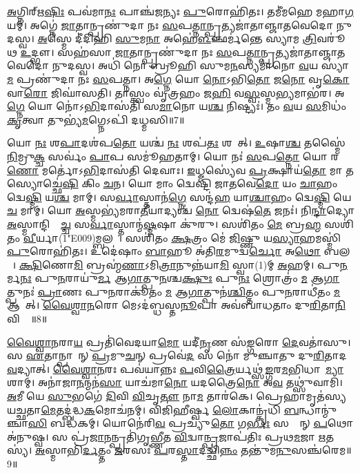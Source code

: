 \ul{𑌅}𑌗𑍍𑌨𑌿𑌰𑍍\mbox{}𑌋\ul{𑌷𑌿𑌃} 𑌪𑌵॑𑌮𑌾\ul{𑌨𑌃} 𑌪𑌾𑌞𑍍𑌚॑𑌜𑌨𑍍𑌯𑌃 \ul{𑌪𑍁}𑌰𑍋𑌹𑌿॑𑌤𑌃। 
𑌤𑌮𑍀॑𑌮𑌹𑍇 𑌮𑌹𑌾\ul{𑌗}𑌯𑌮𑍍। 
𑌅𑌗𑍍𑌨𑍇॑ \ul{𑌜𑌾}𑌤𑌾𑌨𑍍𑌪𑍍𑌰𑌣𑍁॑𑌦𑌾 𑌨𑌃 \ul{𑌸}𑌪\ul{𑌤𑍍𑌨𑌾}𑌨𑍍𑌪𑍍𑌰𑌤𑍍𑌯𑌜𑌾॑𑌤𑌾𑌞𑍍𑌜𑌾𑌤𑌵𑍇𑌦𑍋 𑌨𑍁𑌦𑌸𑍍𑌵। 
\ul{𑌅}𑌸𑍍𑌮𑍇 𑌦𑍀॑𑌦𑌿𑌹𑌿 \ul{𑌸𑍁}𑌮\ul{𑌨𑌾} 𑌅𑌹𑍇॑\ul{𑌳}𑌞𑍍𑌛𑌰𑍍𑌮॑𑌨𑍍𑌤𑍇 𑌸𑍍𑌯𑌾𑌮 \ul{𑌤𑍍𑌰𑌿}𑌵𑌰𑍂॑𑌥 \ul{𑌉}𑌦𑍍𑌭𑍗। 
𑌸𑌹॑𑌸𑌾 \ul{𑌜𑌾}𑌤𑌾𑌨𑍍𑌪𑍍𑌰𑌣𑍁॑𑌦𑌾 𑌨𑌃 \ul{𑌸}𑌪\ul{𑌤𑍍𑌨𑌾}𑌨𑍍𑌪𑍍𑌰𑌤𑍍𑌯𑌜𑌾॑𑌤𑌾𑌞𑍍𑌜𑌾𑌤𑌵𑍇𑌦𑍋 𑌨𑍁𑌦𑌸𑍍𑌵। 
𑌅𑌧𑌿॑ 𑌨𑍋 𑌬𑍍𑌰𑍂𑌹𑌿 𑌸𑍁𑌮\ul{𑌨}𑌸𑍍𑌯𑌮𑌾॑𑌨𑍋 \ul{𑌵}𑌯 𑌸𑍍𑌯𑌾॑\ul{𑌮} 𑌪𑍍𑌰𑌣𑍁॑𑌦𑌾 𑌨𑌃 \ul{𑌸}𑌪𑌤𑍍𑌨𑌾\sn{}। 
𑌅\ul{𑌗𑍍𑌨𑍇} 𑌯𑍋 \ul{𑌨𑍋}𑌽𑌭𑌿\ul{𑌤𑍋} 𑌜\ul{𑌨𑍋} 𑌵𑍃\ul{𑌕𑍋} 𑌵𑌾\ul{𑌰𑍋} 𑌜𑌿𑌘𑌾॑𑌸𑌤𑌿। 
𑌤𑌾𑌸𑍍𑌤𑍍𑌵𑌂 𑌵𑍃॑𑌤𑍍𑌰𑌹𑌂 𑌜\ul{𑌹𑌿} 𑌵\ul{𑌸𑍍𑌵}𑌸𑍍𑌮\ul{𑌭𑍍𑌯}𑌮𑌾𑌭॑𑌰। 
𑌅\ul{𑌗𑍍𑌨𑍇} 𑌯𑍋 𑌨𑍋॑𑌽\ul{𑌭𑌿}𑌦𑌾𑌸॑𑌤𑌿 𑌸\ul{𑌮𑌾}𑌨𑍋 𑌯\ul{𑌶𑍍𑌚} 𑌨𑌿𑌷𑍍𑌟𑍍𑌯𑌃॑। 
𑌤𑌂 \ul{𑌵}𑌯 \ul{𑌸}𑌮𑌿𑌧𑌂॑ \ul{𑌕𑍃}𑌤𑍍𑌵𑌾 𑌤𑍁𑌭𑍍𑌯॑\ul{𑌮}𑌗𑍍𑌨𑍇𑌽𑌪𑌿॑ 𑌦𑌧𑍍𑌮𑌸𑌿॥7॥

𑌯𑍋 \ul{𑌨𑌃} 𑌶\ul{𑌪𑌾}𑌦𑌶॑𑌪\ul{𑌤𑍋} 𑌯𑌶𑍍𑌚॑ \ul{𑌨𑌃} 𑌶𑌪॑\ul{𑌤𑌃} 𑌶𑌪𑌾᳚𑌤𑍍। 
\ul{𑌉}𑌷𑌾\ul{𑌶𑍍𑌚} 𑌤𑌸𑍍𑌮𑍈॑ \ul{𑌨𑌿}𑌮𑍍𑌰𑍁\ul{𑌕𑍍𑌚} 𑌸𑌰𑍍𑌵𑌂॑ \ul{𑌪𑌾}𑌪 𑌸𑌮𑍂॑𑌹𑌤𑌾𑌮𑍍। 
𑌯𑍋 𑌨𑌃॑ \ul{𑌸}𑌪\ul{𑌤𑍍𑌨𑍋} 𑌯𑍋 𑌰\ul{𑌣𑍋} 𑌮𑌰𑍍𑌤𑍋॑𑌽\ul{𑌭𑌿}𑌦𑌾𑌸॑𑌤𑌿 𑌦𑍇𑌵𑌾𑌃। 
\ul{𑌇}𑌧𑍍𑌮𑌸𑍍𑌯𑍇॑𑌵 \ul{𑌪𑍍𑌰}𑌕𑍍𑌷𑌾𑌯॑\ul{𑌤𑍋} 𑌮𑌾 𑌤𑌸𑍍𑌯𑍋𑌚𑍍𑌛𑍇॑\ul{𑌷𑌿} 𑌕𑌿𑌂 \ul{𑌚}𑌨। 
𑌯𑍋 𑌮𑌾𑌂 𑌦𑍍𑌵𑍇𑌷𑍍𑌟𑌿॑ 𑌜𑌾𑌤𑌵𑍇\ul{𑌦𑍋} 𑌯𑌂 \ul{𑌚𑌾}𑌹𑌂 𑌦𑍍𑌵𑍇\ul{𑌷𑍍𑌮𑌿} 𑌯\ul{𑌶𑍍𑌚} 𑌮𑌾𑌮𑍍। 
𑌸\ul{𑌰𑍍𑌵𑌾}\ul{}𑌸𑍍𑌤𑌾𑌨॑\ul{𑌗𑍍𑌨𑍇} 𑌸𑌨𑍍𑌦॑\ul{𑌹} 𑌯𑌾\ul{𑌶𑍍𑌚𑌾}𑌹𑌂 𑌦𑍍𑌵𑍇\ul{𑌷𑍍𑌮𑌿} 𑌯𑍇 \ul{𑌚} 𑌮𑌾𑌮𑍍। 
𑌯𑍋 \ul{𑌅}𑌸𑍍𑌮𑌭𑍍𑌯॑𑌮𑌰𑌾\ul{𑌤𑍀}𑌯𑌾𑌦𑍍𑌯𑌶𑍍𑌚॑ \ul{𑌨𑍋} 𑌦𑍍𑌵𑍇𑌷॑\ul{𑌤𑍇} 𑌜𑌨𑌃॑। 
𑌨𑌿\ul{𑌨𑍍𑌦𑌾}𑌦𑍍𑌯𑍋 \ul{𑌅}𑌸𑍍𑌮𑌾𑌨𑍍𑌦𑌿𑌫𑍍𑌸𑌾᳚\ul{𑌚𑍍𑌚} 𑌸\ul{𑌰𑍍𑌵𑌾}\ul{}𑌸𑍍𑌤𑌾𑌨𑍍𑌮॑\ul{𑌷𑍍𑌮}𑌷𑌾 𑌕𑍁॑𑌰𑍁। 
𑌸𑌶𑌿॑𑌤𑌂 \ul{𑌮𑍇} 𑌬𑍍𑌰\ul{𑌹𑍍𑌮} 𑌸𑌶𑌿॑𑌤𑌂 \ul{𑌵𑍀}𑌰𑍍𑌯𑌾(1\char"E009)𑌮𑍍𑌬𑌲𑌮𑍍᳚। 
𑌸𑌶𑌿॑𑌤𑌂 \ul{𑌕𑍍𑌷}𑌤𑍍𑌰𑌂 𑌮𑍇॑ \ul{𑌜𑌿}𑌷𑍍𑌣𑍁 𑌯\ul{𑌸𑍍𑌯𑌾}𑌹𑌮𑌸𑍍𑌮𑌿॑ \ul{𑌪𑍁}𑌰𑍋𑌹𑌿॑𑌤𑌃। 
𑌉𑌦𑍇॑𑌷𑌾𑌂 \ul{𑌬𑌾}𑌹𑍂 𑌅॑𑌤𑌿\ul{𑌰}𑌮𑍁𑌦𑍍𑌵\ul{𑌰𑍍𑌚𑍋} 𑌅\ul{𑌥𑍋} 𑌬𑌲𑌮𑍍᳚। 
\ul{𑌕𑍍𑌷𑌿}𑌣𑍋\ul{𑌮𑌿} 𑌬𑍍𑌰𑌹𑍍𑌮॑\ul{𑌣𑌾}𑌽𑌮𑌿\ul{𑌤𑍍𑌰𑌾}𑌨𑍁𑌨𑍍𑌨॑𑌯𑌾\ul{𑌮𑌿} 𑌸𑍍𑌵𑌾(1)𑌮𑍍 \ul{𑌅}𑌹𑌮𑍍। 
𑌪𑍁\ul{𑌨}𑌰𑍍𑌮\ul{𑌨𑌃} 𑌪𑍁\ul{𑌨}𑌰𑌾𑌯𑍁॑\ul{𑌰𑍍𑌮} 𑌆\ul{𑌗𑌾}𑌤𑍍𑌪𑍁\ul{𑌨}𑌶𑍍𑌚\ul{𑌕𑍍𑌷𑍁𑌃} 𑌪𑍁\ul{𑌨𑌃} 𑌶𑍍𑌰𑍋𑌤𑍍𑌰𑌂॑ \ul{𑌮} 𑌆\ul{𑌗𑌾}𑌤𑍍𑌪𑍁𑌨𑌃॑ \ul{𑌪𑍍𑌰𑌾}𑌣𑌃 𑌪𑍁\ul{𑌨}𑌰𑌾𑌕𑍂॑𑌤𑌂 \ul{𑌮} 𑌆\ul{𑌗𑌾}𑌤𑍍𑌪𑍁𑌨॑\ul{𑌶𑍍𑌚𑌿}𑌤𑍍𑌤𑌂 𑌪𑍁\ul{𑌨}𑌰𑌾𑌧𑍀॑𑌤𑌂 \ul{𑌮} 𑌆𑌗𑌾᳚𑌤𑍍। 
\ul{𑌵𑍈}\ul{𑌶𑍍𑌵𑌾}\ul{𑌨}𑌰𑍋 𑌮𑍇𑌽𑌦॑𑌬𑍍𑌧𑌸𑍍𑌤\ul{𑌨𑍂}𑌪𑌾 𑌅𑌵॑𑌬𑌾𑌧𑌤𑌾𑌂 𑌦𑍁\ul{𑌰𑌿}𑌤𑌾\ul{𑌨𑌿} 𑌵𑌿𑌶𑍍𑌵𑌾᳚॥8॥\anuvakamend

\ul{𑌵𑍈}\ul{𑌶𑍍𑌵𑌾}\ul{𑌨}𑌰𑌾\ul{𑌯} 𑌪𑍍𑌰𑌤𑌿॑𑌵𑍇𑌦𑌯𑌾\ul{𑌮𑍋} 𑌯𑌦𑍀॑\ul{𑌨𑍃}𑌣 𑌸॑\ul{𑌙𑍍𑌗}𑌰𑍋 \ul{𑌦𑍇}𑌵𑌤𑌾॑𑌸𑍁। 
𑌸 \ul{𑌏}𑌤𑌾𑌨𑍍𑌪𑌾𑌶𑌾᳚𑌨𑍍 \ul{𑌪𑍍𑌰}𑌮𑍁\ul{𑌚}𑌨𑍍 𑌪𑍍𑌰𑌵𑍇॑\ul{𑌦} 𑌸 𑌨𑍋॑ 𑌮𑍁𑌞𑍍𑌚𑌾𑌤𑍁 𑌦𑍁\ul{𑌰𑌿}𑌤𑌾𑌦\ul{𑌵}𑌦𑍍𑌯𑌾𑌤𑍍। 
\ul{𑌵𑍈}\ul{𑌶𑍍𑌵𑌾}\ul{𑌨}𑌰𑌃 𑌪𑌵॑𑌯𑌾𑌨𑍍𑌨𑌃 \ul{𑌪}𑌵𑌿\ul{𑌤𑍍𑌰𑍈}𑌰𑍍𑌯𑌥𑍍𑌸॑\ul{𑌙𑍍𑌗}𑌰\ul{𑌮}𑌭𑌿𑌧𑌾𑌵𑌾᳚\ul{𑌮𑍍𑌯𑌾}𑌶𑌾𑌮𑍍। 
𑌅𑌨𑌾॑𑌜𑌾\ul{𑌨}𑌨𑍍𑌮𑌨॑\ul{𑌸𑌾} 𑌯𑌾𑌚॑𑌮𑌾\ul{𑌨𑍋} 𑌯𑌦𑌤𑍍𑌰𑍈\ul{𑌨𑍋} 𑌅\ul{𑌵} 𑌤𑌥𑍍𑌸𑍁॑𑌵𑌾𑌮𑌿। 
\ul{𑌅}𑌮𑍀 𑌯𑍇 \ul{𑌸𑍁}𑌭𑌗𑍇॑ \ul{𑌦𑌿}𑌵𑌿 \ul{𑌵𑌿}𑌚𑍃\ul{𑌤𑍗} 𑌨𑌾\ul{𑌮} 𑌤𑌾𑌰॑𑌕𑍇। 
𑌪𑍍𑌰𑍇𑌹𑌾𑌮𑍃𑌤॑𑌸𑍍𑌯 𑌯𑌚𑍍𑌛𑌤𑌾\ul{𑌮𑍇}𑌤𑌦𑍍𑌬॑𑌦𑍍𑌧\ul{𑌕}𑌮𑍋𑌚॑𑌨𑌮𑍍। 
𑌵𑌿𑌜𑌿॑𑌹𑍀𑌰𑍍𑌷𑍍𑌵 \ul{𑌲𑍋}𑌕𑌾𑌨𑍍𑌕𑍃॑𑌧𑌿 \ul{𑌬}𑌨𑍍𑌧𑌾𑌨𑍍𑌮𑍁॑𑌞𑍍𑌚𑌾\ul{𑌸𑌿} 𑌬𑌦𑍍𑌧॑𑌕𑌮𑍍। 
𑌯𑍋𑌨𑍇॑𑌰𑌿\ul{𑌵} 𑌪𑍍𑌰𑌚𑍍𑌯𑍁॑\ul{𑌤𑍋} 𑌗\ul{𑌰𑍍𑌭𑌃} 𑌸𑌰𑍍𑌵𑌾᳚𑌨𑍍 \ul{𑌪}𑌥𑍋 𑌅॑𑌨𑍁𑌷𑍍𑌵। 
𑌸 𑌪𑍍𑌰॑\ul{𑌜𑌾}𑌨𑌨𑍍𑌪𑍍𑌰𑌤𑌿॑𑌗𑍃𑌭𑍍𑌣𑍀𑌤 \ul{𑌵𑌿}𑌦𑍍𑌵𑌾\ul{𑌨𑍍𑌪𑍍𑌰}𑌜𑌾𑌪॑𑌤𑌿𑌃 𑌪𑍍𑌰𑌥\ul{𑌮}𑌜𑌾 \ul{𑌋}𑌤𑌸𑍍𑌯॑। 
\ul{𑌅}𑌸𑍍𑌮𑌾𑌭𑌿॑\ul{𑌰𑍍𑌦}𑌤𑍍𑌤𑌂 \ul{𑌜}𑌰𑌸𑌃॑ \ul{𑌪}𑌰\ul{𑌸𑍍𑌤𑌾}𑌦𑌚𑍍𑌛𑌿॑\ul{𑌨𑍍𑌨𑌂} 𑌤𑌨𑍍𑌤𑍁॑𑌮\ul{𑌨𑍁}𑌸𑌞𑍍𑌚॑𑌰𑍇𑌮॥9॥

